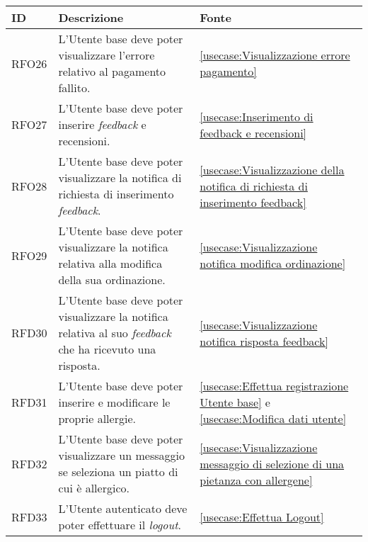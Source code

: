 \begin{table}[H]
	\renewcommand{\arraystretch}{1.5}
	\centering
	\begin{tabularx}{\textwidth}{l|X|p{2cm}}
		\textbf{ID} & \textbf{Descrizione}                                                                                              & \textbf{Fonte}                                                                        \\
		\hline
		RFO26       & L'Utente base deve poter visualizzare l'errore relativo al pagamento fallito.                                     & \autoref{usecase:Visualizzazione errore pagamento}                                    \\
		\hline
		RFO27       & L'Utente base deve poter inserire \textit{feedback} e recensioni.                                                 & \autoref{usecase:Inserimento di feedback e recensioni}                                \\
		\hline
		RFO28       & L'Utente base deve poter visualizzare la notifica di richiesta di inserimento \textit{feedback}.                  & \autoref{usecase:Visualizzazione della notifica di richiesta di inserimento feedback} \\
		\hline
		RFO29       & L'Utente base deve poter visualizzare la notifica relativa alla modifica della sua ordinazione.                   & \autoref{usecase:Visualizzazione notifica modifica ordinazione}                       \\
		\hline
		RFD30       & L'Utente base deve poter visualizzare la notifica relativa al suo \textit{feedback} che ha ricevuto una risposta. & \autoref{usecase:Visualizzazione notifica risposta feedback}                          \\
		\hline
		RFD31       & L'Utente base deve poter inserire e modificare le proprie allergie. 												& \autoref{usecase:Effettua registrazione Utente base} e \autoref{usecase:Modifica dati utente}                      \\
		\hline
		RFD32       & L'Utente base deve poter visualizzare un messaggio se seleziona un piatto di cui è allergico. 					& \autoref{usecase:Visualizzazione messaggio di selezione di una pietanza con allergene}                      \\
		\hline
		RFD33       & L'Utente autenticato deve poter effettuare il \textit{logout}.                                                    & \autoref{usecase:Effettua Logout}                                                     \\

\end{tabularx}
\end{table}
